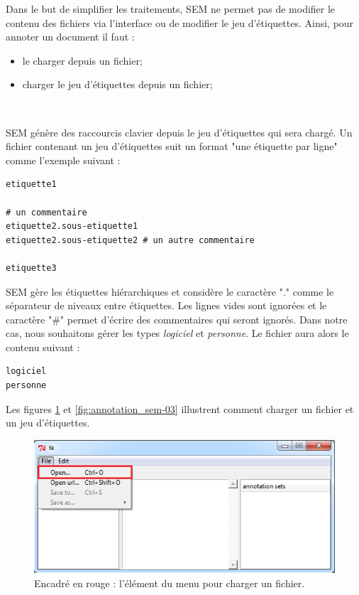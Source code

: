 \documentclass[manual-fr.tex]{subfiles}
\begin{document}
Dans le but de simplifier les traitements, SEM ne permet pas de modifier le contenu des fichiers via l'interface ou de modifier le jeu d'étiquettes. Ainsi, pour annoter un document il faut :
\begin{itemize}
    \item le charger depuis un fichier;
    \item charger le jeu d'étiquettes depuis un fichier;
\end{itemize}

~

SEM génère des raccourcis clavier depuis le jeu d'étiquettes qui sera chargé. Un fichier contenant un jeu d'étiquettes suit un format "une étiquette par ligne" comme l'exemple suivant :

\begin{lstlisting}[frame=single]
etiquette1

# un commentaire
etiquette2.sous-etiquette1
etiquette2.sous-etiquette2 # un autre commentaire

etiquette3
\end{lstlisting}

SEM gère les étiquettes hiérarchiques et considère le caractère "." comme le séparateur de niveaux entre étiquettes. Les lignes vides sont ignorées et le caractère "\#" permet d'écrire des commentaires qui seront ignorés. Dans notre cas, nous souhaitons gérer les types \emph{logiciel} et \emph{personne}. Le fichier aura alors le contenu suivant :

\begin{lstlisting}[frame=single]
logiciel
personne
\end{lstlisting}

Les figures \ref{fig:annotation_sem-02} et \ref{fig:annotation_sem-03} illustrent comment charger un fichier et un jeu d'étiquettes.

\begin{figure}[ht!]
    \begin{center}
    \includegraphics[scale=0.5]{fr/images/annotation_sem-02.png}
    \end{center}
    \caption{Encadré en rouge : l'élément du menu pour charger un fichier.}
    \label{fig:annotation_sem-02}
\end{figure}
\end{document}
